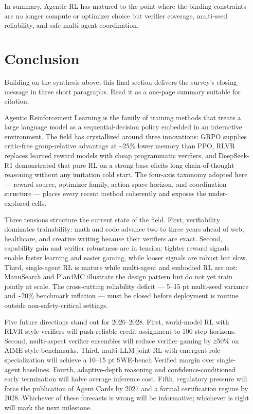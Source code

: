 \documentclass{article}
\begin{document}
In summary, Agentic RL has matured to the point where the binding constraints are no longer compute or optimizer choice but verifier coverage, multi-seed reliability, and safe multi-agent coordination.

\section{Conclusion}\label{conclusion}

Building on the synthesis above, this final section delivers the survey's closing message in three short paragraphs. Read it as a one-page summary suitable for citation.

Agentic Reinforcement Learning is the family of training methods that treats a large language model as a sequential-decision policy embedded in an interactive environment. The field has crystallized around three innovations: GRPO supplies critic-free group-relative advantage at \textasciitilde25\% lower memory than PPO, RLVR replaces learned reward models with cheap programmatic verifiers, and DeepSeek-R1 demonstrated that pure RL on a strong base elicits long chain-of-thought reasoning without any imitation cold start. The four-axis taxonomy adopted here --- reward source, optimizer family, action-space horizon, and coordination structure --- places every recent method coherently and exposes the under-explored cells.

Three tensions structure the current state of the field. First, verifiability dominates trainability: math and code advance two to three years ahead of web, healthcare, and creative writing because their verifiers are exact. Second, capability gain and verifier robustness are in tension: tighter reward signals enable faster learning and easier gaming, while looser signals are robust but slow. Third, single-agent RL is mature while multi-agent and embodied RL are not: ManuSearch and Plan4MC illustrate the design pattern but do not yet train jointly at scale. The cross-cutting reliability deficit --- 5--15 pt multi-seed variance and \textasciitilde20\% benchmark inflation --- must be closed before deployment is routine outside non-safety-critical settings.

Five future directions stand out for 2026--2028. First, world-model RL with RLVR-style verifiers will push reliable credit assignment to 100-step horizons. Second, multi-aspect verifier ensembles will reduce verifier gaming by ≥50\% on AIME-style benchmarks. Third, multi-LLM joint RL with emergent role specialization will achieve a 10--15 pt SWE-bench Verified margin over single-agent baselines. Fourth, adaptive-depth reasoning and confidence-conditioned early termination will halve average inference cost. Fifth, regulatory pressure will force the publication of Agent Cards by 2027 and a formal certification regime by 2028. Whichever of these forecasts is wrong will be informative; whichever is right will mark the next milestone.



\end{document}
